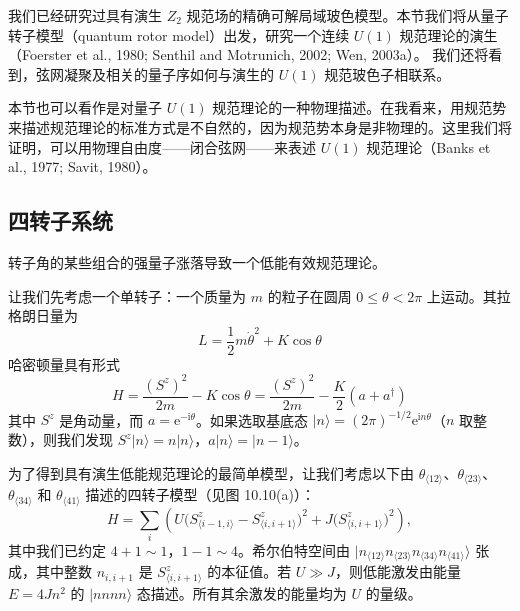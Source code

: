 我们已经研究过具有演生 $Z_2$ 规范场的精确可解局域玻色模型。本节我们将从量子转子模型（quantum rotor model）出发，研究一个连续 $U(1)$ 规范理论的演生（Foerster et al., 1980; Senthil and Motrunich, 2002; Wen, 2003a）。
我们还将看到，弦网凝聚及相关的量子序如何与演生的 $U(1)$ 规范玻色子相联系。

本节也可以看作是对量子 $U(1)$ 规范理论的一种物理描述。在我看来，用规范势来描述规范理论的标准方式是不自然的，因为规范势本身是非物理的。这里我们将证明，可以用物理自由度——闭合弦网——来表述 $U(1)$ 规范理论（Banks et al., 1977; Savit, 1980）。

\subsection{四转子系统}

\begin{keypoints}
\item 转子角的某些组合的强量子涨落导致一个低能有效规范理论。
\end{keypoints}

让我们先考虑一个单转子：一个质量为 $m$ 的粒子在圆周 $0\leqslant\theta<2\pi$ 上运动。其拉格朗日量为
\begin{equation*}
L=\frac{1}{2}m\dot\theta^{2}+K\cos\theta
\end{equation*}
哈密顿量具有形式
\begin{equation*}
H=\frac{(S^{z})^{2}}{2m}-K\cos\theta=\frac{(S^{z})^{2}}{2m}-\frac{K}{2}(a+a^{\dagger})
\end{equation*}
其中 $S^{z}$ 是角动量，而 $a=\mathrm{e}^{-\mathrm{i}\theta}$。如果选取基底态 $|n\rangle=(2\pi)^{-1/2}\mathrm{e}^{\mathrm{i}n\theta}$（$n$ 取整数），则我们发现 $S^{z}|n\rangle=n|n\rangle$，$a|n\rangle=|n-1\rangle$。

为了得到具有演生低能规范理论的最简单模型，让我们考虑以下由 $\theta_{\langle12\rangle}$、$\theta_{\langle23\rangle}$、$\theta_{\langle34\rangle}$ 和 $\theta_{\langle41\rangle}$ 描述的四转子模型（见图 10.10(a)）：
\begin{equation*}
H=\sum_{i}\left(U\big(S_{\langle i-1,i\rangle}^{z}-S_{\langle i,i+1\rangle}^{z}\big)^{2}+J\big(S_{\langle i,i+1\rangle}^{z}\big)^{2}\right), \tag{10.6.1}
\end{equation*}
其中我们已约定 $4+1\sim1$，$1-1\sim4$。希尔伯特空间由 $|n_{\langle12\rangle}n_{\langle23\rangle}n_{\langle34\rangle}n_{\langle41\rangle}\rangle$ 张成，其中整数 $n_{i,i+1}$ 是 $S_{\langle i,i+1\rangle}^{z}$ 的本征值。若 $U\gg J$，则低能激发由能量 $E=4Jn^{2}$ 的 $|nnnn\rangle$ 态描述。所有其余激发的能量均为 $U$ 的量级。

